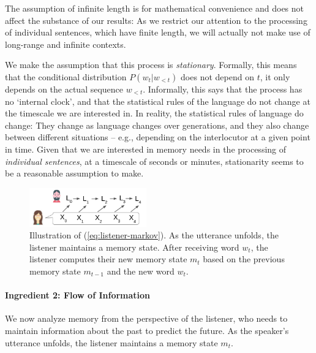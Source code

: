 \documentclass[11pt,letterpaper]{article}
\begin{document}

The assumption of infinite length is for mathematical convenience and does not affect the substance of our results:
As we restrict our attention to the processing of individual sentences, which have finite length, we will actually not make use of long-range and infinite contexts.

We make the assumption that this process is \emph{stationary}.
Formally, this means that the conditional distribution $P(w_t|w_{<t})$ does not depend on $t$, it only depends on the actual sequence $w_{<t}$.
Informally, this says that the process has no `internal clock', and that the statistical rules of the language do not change at the timescale we are interested in.
In reality, the statistical rules of language do change: They change as language changes over generations, and they also change between different situations -- e.g., depending on the interlocutor at a given point in time.
Given that we are interested in memory needs in the processing of \emph{individual sentences}, at a timescale of seconds or minutes, stationarity seems to be a reasonable assumption to make.





\begin{figure}
\includegraphics[width=0.45\textwidth]{figures/markov-condition.png}
	\caption{Illustration of (\ref{eq:listener-markov}). As the utterance unfolds, the listener maintains a memory state. After receiving word $w_t$, the listener computes their new memory state $m_t$ based on the previous memory state $m_{t-1}$ and the new word $w_t$.}\label{fig:listener-markov}
\end{figure}


\paragraph{Ingredient 2: Flow of Information}
We now analyze memory from the perspective of the listener, who needs to maintain information about the past to predict the future.
As the speaker's utterance unfolds, the listener maintains a memory state $m_t$.
\end{document}
